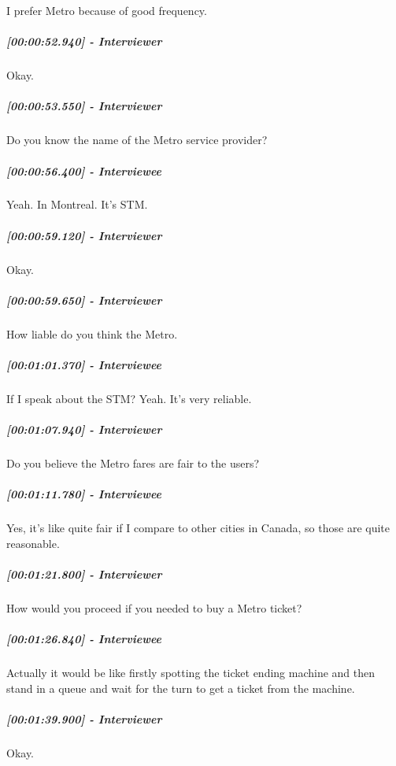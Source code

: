 \documentclass[a4paper,12pt]{article}
\begin{document}
I prefer Metro because of good frequency.

\hypertarget{interviewer-9}{%
\subparagraph{{[}00:00:52.940{]} - Interviewer}\label{interviewer-9}}

Okay.

\hypertarget{interviewer-10}{%
\subparagraph{{[}00:00:53.550{]} - Interviewer}\label{interviewer-10}}

Do you know the name of the Metro service provider?

\hypertarget{interviewee-5}{%
\subparagraph{{[}00:00:56.400{]} - Interviewee}\label{interviewee-5}}

Yeah. In Montreal. It's STM.

\hypertarget{interviewer-11}{%
\subparagraph{{[}00:00:59.120{]} - Interviewer}\label{interviewer-11}}

Okay.

\hypertarget{interviewer-12}{%
\subparagraph{{[}00:00:59.650{]} - Interviewer}\label{interviewer-12}}

How liable do you think the Metro.

\hypertarget{interviewee-6}{%
\subparagraph{{[}00:01:01.370{]} - Interviewee}\label{interviewee-6}}

If I speak about the STM? Yeah. It's very reliable.

\hypertarget{interviewer-13}{%
\subparagraph{{[}00:01:07.940{]} - Interviewer}\label{interviewer-13}}

Do you believe the Metro fares are fair to the users?

\hypertarget{interviewee-7}{%
\subparagraph{{[}00:01:11.780{]} - Interviewee}\label{interviewee-7}}

Yes, it's like quite fair if I compare to other cities in Canada, so
those are quite reasonable.

\hypertarget{interviewer-14}{%
\subparagraph{{[}00:01:21.800{]} - Interviewer}\label{interviewer-14}}

How would you proceed if you needed to buy a Metro ticket?

\hypertarget{interviewee-8}{%
\subparagraph{{[}00:01:26.840{]} - Interviewee}\label{interviewee-8}}

Actually it would be like firstly spotting the ticket ending machine and
then stand in a queue and wait for the turn to get a ticket from the
machine.

\hypertarget{interviewer-15}{%
\subparagraph{{[}00:01:39.900{]} - Interviewer}\label{interviewer-15}}

Okay.
\end{document}
